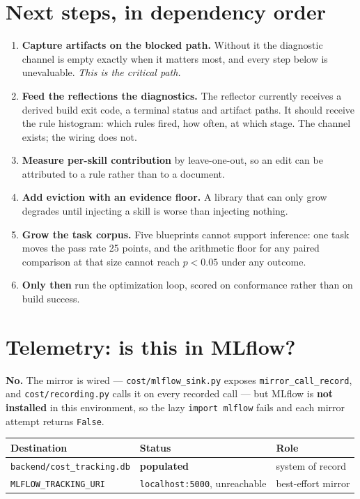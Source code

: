 \documentclass[11pt,a4paper]{article}
\begin{document}
\section{Next steps, in dependency order}

\begin{enumerate}[leftmargin=1.4em]
  \item \textbf{Capture artifacts on the blocked path.} Without it the diagnostic
  channel is empty exactly when it matters most, and every step below is
  unevaluable. \emph{This is the critical path.}
  \item \textbf{Feed the reflections the diagnostics.} The reflector currently
  receives a derived build exit code, a terminal status and artifact paths. It
  should receive the rule histogram: which rules fired, how often, at which stage.
  The channel exists; the wiring does not.
  \item \textbf{Measure per-skill contribution} by leave-one-out, so an edit can be
  attributed to a rule rather than to a document.
  \item \textbf{Add eviction with an evidence floor.} A library that can only grow
  degrades until injecting a skill is worse than injecting nothing.
  \item \textbf{Grow the task corpus.} Five blueprints cannot support inference: one
  task moves the pass rate 25 points, and the arithmetic floor for any paired
  comparison at that size cannot reach $p<0.05$ under any outcome.
  \item \textbf{Only then} run the optimization loop, scored on conformance rather
  than on build success.
\end{enumerate}

\section{Telemetry: is this in MLflow?}
\label{sec:mlflow}

\textbf{No.} The mirror is wired --- \texttt{cost/mlflow\_sink.py} exposes
\texttt{mirror\_call\_record}, and \texttt{cost/recording.py} calls it on every
recorded call --- but MLflow is \textbf{not installed} in this environment, so the
lazy \texttt{import mlflow} fails and each mirror attempt returns \texttt{False}.

\begin{center}
\begin{tabular}{@{}lll@{}}
\toprule
\textbf{Destination} & \textbf{Status} & \textbf{Role} \\
\midrule
\texttt{backend/cost\_tracking.db} & \textbf{populated} & system of record \\
\texttt{MLFLOW\_TRACKING\_URI} & \texttt{localhost:5000}, unreachable & best-effort mirror \\
\bottomrule
\end{tabular}
\end{center}
\end{document}
